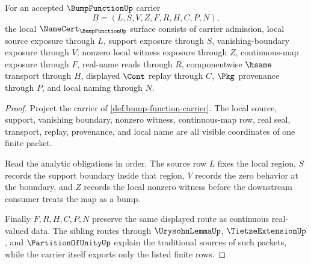 \begin{theorem}
\label{thm:bump-function-namecert-obligations}
For an accepted $\BumpFunctionUp$ carrier
$$
B=(L,S,V,Z,F,R,H,C,P,N),
$$
the local $\NameCert_{\BumpFunctionUp}$ surface consists of carrier admission, local source exposure through $L$, support exposure through $S$, vanishing-boundary exposure through $V$, nonzero local witness exposure through $Z$, continuous-map exposure through $F$, real-name reads through $R$, componentwise $\hsame$ transport through $H$, displayed $\Cont$ replay through $C$, $\Pkg$ provenance through $P$, and local naming through $N$.
\end{theorem}
\begin{proof}
Project the carrier of \autoref{def:bump-function-carrier}. The local source, support, vanishing boundary, nonzero witness, continuous-map row, real seal, transport, replay, provenance, and local name are all visible coordinates of one finite packet.

Read the analytic obligations in order. The source row $L$ fixes the local region, $S$ records the support boundary inside that region, $V$ records the zero behavior at the boundary, and $Z$ records the local nonzero witness before the downstream consumer treats the map as a bump.

Finally $F,R,H,C,P,N$ preserve the same displayed route as continuous real-valued data. The sibling routes through $\UrysohnLemmaUp$, $\TietzeExtensionUp$, and $\PartitionOfUnityUp$ explain the traditional sources of such packets, while the carrier itself exports only the listed finite rows.
\end{proof}

